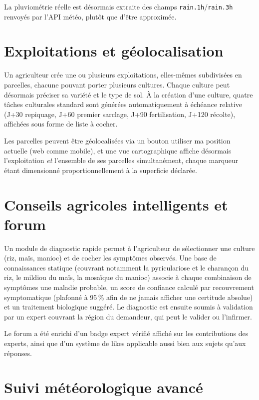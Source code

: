 \documentclass[12pt,a4paper]{report}
\begin{document}
La pluviométrie réelle est désormais extraite des champs \texttt{rain.1h}/\texttt{rain.3h} renvoyés par l'API météo, plutôt que d'être approximée.

\section{Exploitations et géolocalisation}

Un agriculteur crée une ou plusieurs exploitations, elles-mêmes subdivisées en parcelles, chacune pouvant porter plusieurs cultures. Chaque culture peut désormais préciser sa variété et le type de sol. À la création d'une culture, quatre tâches culturales standard sont générées automatiquement à échéance relative (J+30 repiquage, J+60 premier sarclage, J+90 fertilisation, J+120 récolte), affichées sous forme de liste à cocher.

Les parcelles peuvent être géolocalisées via un bouton \og utiliser ma position actuelle \fg{} (web comme mobile), et une vue cartographique affiche désormais l'exploitation \emph{et} l'ensemble de ses parcelles simultanément, chaque marqueur étant dimensionné proportionnellement à la superficie déclarée.

\section{Conseils agricoles intelligents et forum}

Un module de \og diagnostic rapide \fg{} permet à l'agriculteur de sélectionner une culture (riz, maïs, manioc) et de cocher les symptômes observés. Une base de connaissances statique (couvrant notamment la pyriculariose et le charançon du riz, le mildiou du maïs, la mosaïque du manioc) associe à chaque combinaison de symptômes une maladie probable, un score de confiance calculé par recouvrement symptomatique (plafonné à 95\,\% afin de ne jamais afficher une certitude absolue) et un traitement biologique suggéré. Le diagnostic est ensuite soumis à validation par un expert couvrant la région du demandeur, qui peut le valider ou l'infirmer.

Le forum a été enrichi d'un badge \og expert vérifié \fg{} affiché sur les contributions des experts, ainsi que d'un système de likes applicable aussi bien aux sujets qu'aux réponses.

\section{Suivi météorologique avancé}
\end{document}
